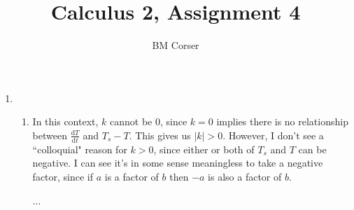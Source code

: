 \documentclass[10pt]{article}
\author{BM Corser}
\title{Calculus 2, Assignment 4}
\newcommand*{\dTdt}[0]{\frac{\text{d}T}{\text{d}t}}
\begin{document}
    \maketitle 
    \begin{enumerate}
        \item 
        \begin{enumerate}
            \item In this context, $k$ cannot be 0, since $k = 0$ implies there
                is no relationship between $\dTdt$ and $T_s - T$. This gives us
                $|k| > 0$. However, I don't see a ``colloquial" reason for $k >
                0$, since either or both of $T_s$ and $T$ can be negative. I
                can see it's in some sense meaningless to take a negative
                factor, since if $a$ is a factor of $b$ then $-a$ is also a
                factor of $b$.

                ...


\end{enumerate}
\end{enumerate}
\end{document}
